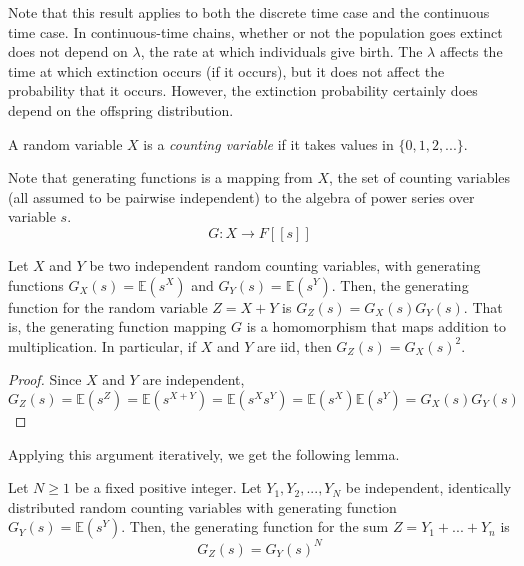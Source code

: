 \documentclass{article}
\begin{document}
      Note that this result applies to both the discrete time case and the continuous time case. In continuous-time chains, whether or not the population goes extinct does not depend on $\lambda$, the rate at which individuals give birth. The $\lambda$ affects the time at which extinction occurs (if it occurs), but it does not affect the probability that it occurs. However, the extinction probability certainly does depend on the offspring distribution. 

      \begin{definition}
        A random variable $X$ is a \textit{counting variable} if it takes values in $\{0, 1, 2, ...\}$. 
      \end{definition}

      Note that generating functions is a mapping from $X$, the set of counting variables (all assumed to be pairwise independent) to the algebra of power series over variable $s$.
      \begin{equation}
        G: X \longrightarrow F[[s]]
      \end{equation}

      \begin{lemma}
        Let $X$ and $Y$ be two independent random counting variables, with generating functions $G_X (s) = \mathbb{E}(s^X)$ and $G_Y (s) = \mathbb{E}(s^Y)$. Then, the generating function for the random variable $Z = X + Y$ is $G_Z(s) = G_X (s) G_Y (s)$. That is, the generating function mapping $G$ is a homomorphism that maps addition to multiplication. In particular, if $X$ and $Y$ are iid, then $G_Z (s) = G_X (s)^2$. 
      \end{lemma}
      \begin{proof}
        Since $X$ and $Y$ are independent, 
        \begin{equation}
          G_Z (s) = \mathbb{E}(s^Z) = \mathbb{E}(s^{X+Y}) = \mathbb{E}(s^X s^Y) = \mathbb{E}(s^X) \mathbb{E}(s^Y) = G_X (s) G_Y (s)
        \end{equation}
      \end{proof}

      Applying this argument iteratively, we get the following lemma. 
      \begin{lemma}
        Let $N \geq 1$ be a fixed positive integer. Let $Y_1, Y_2, ..., Y_N$ be independent, identically distributed random counting variables with generating function $G_Y (s) = \mathbb{E}(s^Y)$. Then, the generating function for the sum $Z = Y_1 + ... + Y_n$ is 
        \begin{equation}
          G_Z (s) = G_Y (s)^N
        \end{equation}
      \end{lemma}
\end{document}
